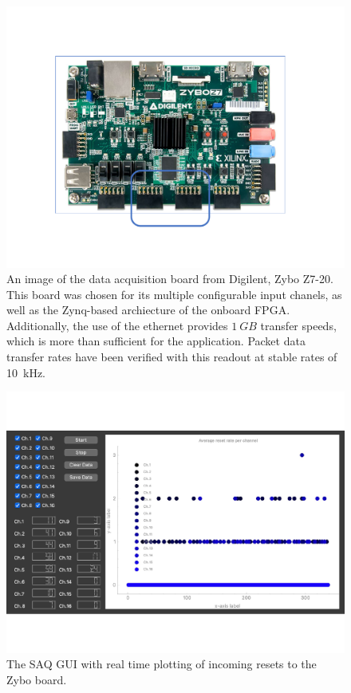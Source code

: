 \begin{figure}[]
\centering
\includegraphics[width=\textwidth]{images/SAQ_zybo_daq.pdf}
\caption{An image of the data acquisition board from Digilent, Zybo Z7-20. 
This board was chosen for its multiple configurable input chanels, as well as the Zynq-based archiecture of the onboard FPGA.
Additionally, the use of the ethernet provides $1~\unit{GB}$ transfer speeds, which is more than sufficient for the application.
Packet data transfer rates have been verified with this readout at stable rates of 10~\unit{kHz}.
}
\label{fig:saq_zybo}
\end{figure}

\begin{figure}[]
\centering
\includegraphics[width=\textwidth]{images/SAQ_gui_resets.pdf}
\caption{The SAQ GUI with real time plotting of incoming resets to the Zybo board.}
\label{fig:saq_gui}
\end{figure}


